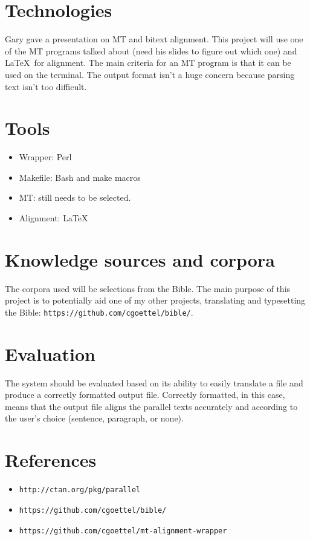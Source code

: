 \documentclass{article}
\begin{document}
\section{Technologies}
Gary gave a presentation on MT and bitext alignment. This project will use one of the MT programs talked about (need his slides to figure out which one) and \LaTeX\ for alignment. The main criteria for an MT program is that it can be used on the terminal. The output format isn't a huge concern because parsing text isn't too difficult.

\section{Tools}
\begin{itemize}
    \item Wrapper: Perl
    \item Makefile: Bash and make macros
    \item MT: still needs to be selected.
    \item Alignment: \LaTeX
\end{itemize}

\section{Knowledge sources and corpora}
The corpora used will be selections from the Bible. The main purpose of this project is to potentially aid one of my other projects, translating and typesetting the Bible: \texttt{https://github.com/cgoettel/bible/}.

\section{Evaluation}
The system should be evaluated based on its ability to easily translate a file and produce a correctly formatted output file. Correctly formatted, in this case, means that the output file aligns the parallel texts accurately and according to the user's choice (sentence, paragraph, or none).

\section{References}
\begin{itemize}
    \item \texttt{http://ctan.org/pkg/parallel}
    \item \texttt{https://github.com/cgoettel/bible/}
    \item \texttt{https://github.com/cgoettel/mt-alignment-wrapper}
\end{itemize}
\end{document}
